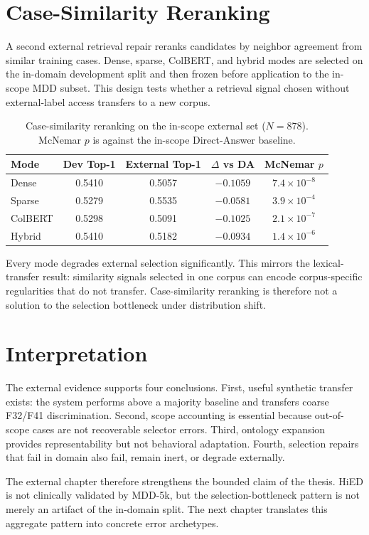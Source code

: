 \section{Case-Similarity Reranking}

A second external retrieval repair reranks candidates by neighbor agreement from similar training cases. Dense, sparse, ColBERT, and hybrid modes are selected on the in-domain development split and then frozen before application to the in-scope MDD subset. This design tests whether a retrieval signal chosen without external-label access transfers to a new corpus.

\begin{table}[htbp]
\centering
\caption{Case-similarity reranking on the in-scope external set ($N=878$). McNemar $p$ is against the in-scope Direct-Answer baseline.}
\label{tab:case-knn-rewrite}
\begin{tabular}{lcccc}
\toprule
Mode & Dev Top-1 & External Top-1 & $\Delta$ vs DA & McNemar $p$\\
\midrule
Dense & 0.5410 & 0.5057 & $-0.1059$ & $7.4\times10^{-8}$\\
Sparse & 0.5279 & 0.5535 & $-0.0581$ & $3.9\times10^{-4}$\\
ColBERT & 0.5298 & 0.5091 & $-0.1025$ & $2.1\times10^{-7}$\\
Hybrid & 0.5410 & 0.5182 & $-0.0934$ & $1.4\times10^{-6}$\\
\bottomrule
\end{tabular}
\end{table}

Every mode degrades external selection significantly. This mirrors the lexical-transfer result: similarity signals selected in one corpus can encode corpus-specific regularities that do not transfer. Case-similarity reranking is therefore not a solution to the selection bottleneck under distribution shift.

\section{Interpretation}

The external evidence supports four conclusions. First, useful synthetic transfer exists: the system performs above a majority baseline and transfers coarse F32/F41 discrimination. Second, scope accounting is essential because out-of-scope cases are not recoverable selector errors. Third, ontology expansion provides representability but not behavioral adaptation. Fourth, selection repairs that fail in domain also fail, remain inert, or degrade externally.

The external chapter therefore strengthens the bounded claim of the thesis. HiED is not clinically validated by MDD-5k, but the selection-bottleneck pattern is not merely an artifact of the in-domain split. The next chapter translates this aggregate pattern into concrete error archetypes.
